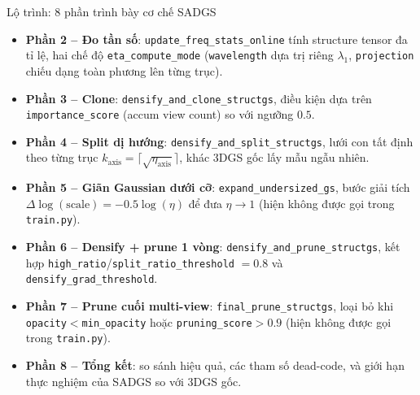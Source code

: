 \begin{frame}{Lộ trình: 8 phần trình bày cơ chế SADGS}
\footnotesize
\begin{itemize}
    \item \textbf{Phần 2 -- Đo tần số}: \texttt{update\_freq\_stats\_online} tính structure tensor đa tỉ lệ, hai chế độ \texttt{eta\_compute\_mode} (\texttt{wavelength} dựa trị riêng $\lambda_1$, \texttt{projection} chiếu dạng toàn phương lên từng trục).
    \item \textbf{Phần 3 -- Clone}: \texttt{densify\_and\_clone\_structgs}, điều kiện dựa trên \texttt{importance\_score} (accum view count) so với ngưỡng $0.5$.
    \item \textbf{Phần 4 -- Split dị hướng}: \texttt{densify\_and\_split\_structgs}, lưới con tất định theo từng trục $k_\text{axis}=\lceil\sqrt{\eta_\text{axis}}\rceil$, khác 3DGS gốc lấy mẫu ngẫu nhiên.
    \item \textbf{Phần 5 -- Giãn Gaussian dưới cỡ}: \texttt{expand\_undersized\_gs}, bước giải tích $\Delta\log(\text{scale}) = -0.5\log(\eta)$ để đưa $\eta \to 1$ \alert{(hiện không được gọi trong \texttt{train.py})}.
    \item \textbf{Phần 6 -- Densify + prune 1 vòng}: \texttt{densify\_and\_prune\_structgs}, kết hợp \texttt{high\_ratio}/\texttt{split\_ratio\_threshold} $=0.8$ và \texttt{densify\_grad\_threshold}.
    \item \textbf{Phần 7 -- Prune cuối multi-view}: \texttt{final\_prune\_structgs}, loại bỏ khi \texttt{opacity}$<$\texttt{min\_opacity} hoặc \texttt{pruning\_score}$>0.9$ \alert{(hiện không được gọi trong \texttt{train.py})}.
    \item \textbf{Phần 8 -- Tổng kết}: so sánh hiệu quả, các tham số dead-code, và giới hạn thực nghiệm của SADGS so với 3DGS gốc.
\end{itemize}
\end{frame}
